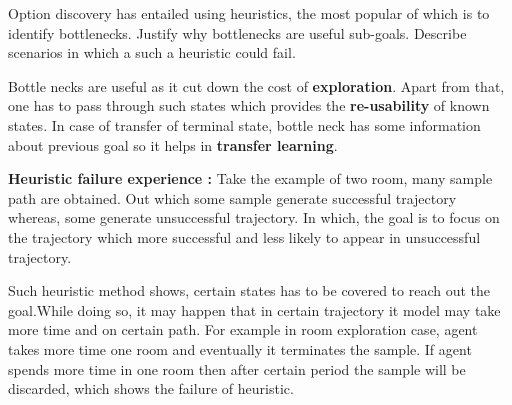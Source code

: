 \documentclass[solution,addpoints,12pt]{exam}
\begin{document}
\begin{questions}
\newpage

\question[3] Option discovery has entailed using heuristics, the most popular of which is to identify bottlenecks. Justify why bottlenecks are useful sub-goals. Describe scenarios in which a such a heuristic could fail.
\begin{solution}
Bottle necks are useful as it cut down the cost of \textbf{exploration}. Apart from that, one has to pass through such states which provides the \textbf{re-usability} of known states. In case of transfer of terminal state, bottle neck has some information about previous goal so it helps in\textbf{ transfer learning}.

\textbf{Heuristic failure experience :}
Take the example of two room, many sample path  are obtained. Out which some sample generate successful trajectory whereas, some generate unsuccessful trajectory. In which, the goal is to focus on the trajectory which more successful and less likely to appear in unsuccessful trajectory. 

Such heuristic method shows, certain states has to be covered to reach out the goal.While doing so, it may happen that in certain trajectory it model may take more time and on certain path. For example in room exploration case, agent takes more time one room and eventually it terminates the sample. If agent spends more time in one room then after certain  period the sample will be discarded, which shows the failure of heuristic.
\end{solution}

\end{questions}
\end{document}
